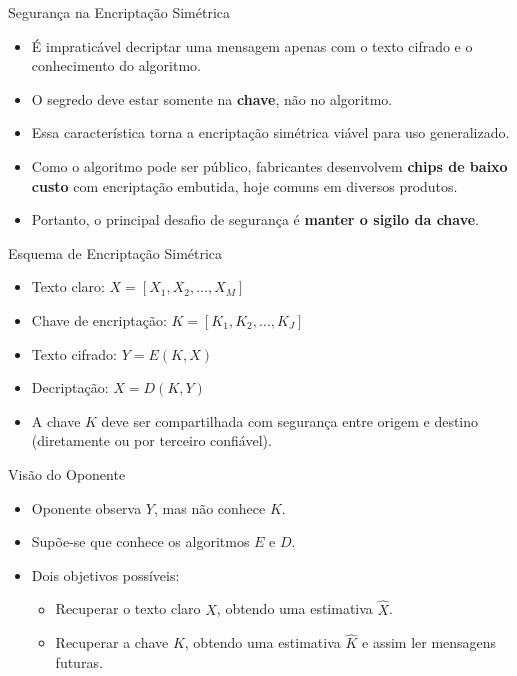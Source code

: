 \begin{frame}{Segurança na Encriptação Simétrica}
    \begin{itemize}
        \item É impraticável decriptar uma mensagem apenas com o texto cifrado e o conhecimento do algoritmo.
        \item O segredo deve estar somente na \textbf{chave}, não no algoritmo.
        \item Essa característica torna a encriptação simétrica viável para uso generalizado.
        \item Como o algoritmo pode ser público, fabricantes desenvolvem \textbf{chips de baixo custo} com encriptação embutida, hoje comuns em diversos produtos.
        \item Portanto, o principal desafio de segurança é \textbf{manter o sigilo da chave}.
    \end{itemize}
\end{frame}

\begin{frame}{Esquema de Encriptação Simétrica}
    \begin{itemize}
        \item Texto claro: $X = [X_1, X_2, \ldots, X_M]$
        \item Chave de encriptação: $K = [K_1, K_2, \ldots, K_J]$
        \item Texto cifrado: $Y = E(K, X)$
        \item Decriptação: $X = D(K, Y)$
        \item A chave $K$ deve ser compartilhada com segurança entre origem e destino (diretamente ou por terceiro confiável).
    \end{itemize}


    \begin{block}{Visão do Oponente}
        \begin{itemize}
            \item Oponente observa $Y$, mas não conhece $K$.
            \item Supõe-se que conhece os algoritmos $E$ e $D$.
            \item Dois objetivos possíveis:
                  \begin{itemize}
                      \item Recuperar o texto claro $X$, obtendo uma estimativa $\hat{X}$.
                      \item Recuperar a chave $K$, obtendo uma estimativa $\hat{K}$ e assim ler mensagens futuras.
                  \end{itemize}
        \end{itemize}
    \end{block}
\end{frame}


